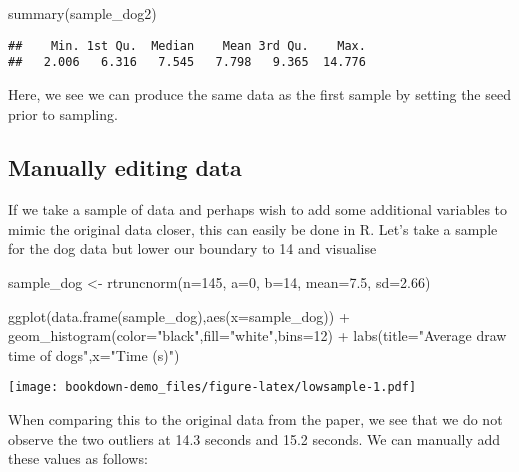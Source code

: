 \documentclass[
]{book}
\newenvironment{Shaded}{\begin{snugshade}}{\end{snugshade}}
\newcommand{\AttributeTok}[1]{\textcolor[rgb]{0.77,0.63,0.00}{#1}}
\newcommand{\DecValTok}[1]{\textcolor[rgb]{0.00,0.00,0.81}{#1}}
\newcommand{\FloatTok}[1]{\textcolor[rgb]{0.00,0.00,0.81}{#1}}
\newcommand{\FunctionTok}[1]{\textcolor[rgb]{0.00,0.00,0.00}{#1}}
\newcommand{\NormalTok}[1]{#1}
\newcommand{\OtherTok}[1]{\textcolor[rgb]{0.56,0.35,0.01}{#1}}
\newcommand{\SpecialCharTok}[1]{\textcolor[rgb]{0.00,0.00,0.00}{#1}}
\newcommand{\StringTok}[1]{\textcolor[rgb]{0.31,0.60,0.02}{#1}}
\begin{document}
\begin{Shaded}
\begin{Highlighting}[]
\FunctionTok{summary}\NormalTok{(sample\_dog2)}
\end{Highlighting}
\end{Shaded}

\begin{verbatim}
##    Min. 1st Qu.  Median    Mean 3rd Qu.    Max. 
##   2.006   6.316   7.545   7.798   9.365  14.776
\end{verbatim}

Here, we see we can produce the same data as the first sample by setting the seed prior to sampling.

\hypertarget{manually-editing-data}{%
\subsection{Manually editing data}\label{manually-editing-data}}

If we take a sample of data and perhaps wish to add some additional variables to mimic the original data closer, this can easily be done in R. Let's take a sample for the dog data but lower our boundary to 14 and visualise

\begin{Shaded}
\begin{Highlighting}[]
\NormalTok{sample\_dog }\OtherTok{\textless{}{-}} \FunctionTok{rtruncnorm}\NormalTok{(}\AttributeTok{n=}\DecValTok{145}\NormalTok{, }\AttributeTok{a=}\DecValTok{0}\NormalTok{, }\AttributeTok{b=}\DecValTok{14}\NormalTok{, }\AttributeTok{mean=}\FloatTok{7.5}\NormalTok{, }\AttributeTok{sd=}\FloatTok{2.66}\NormalTok{)}

\FunctionTok{ggplot}\NormalTok{(}\FunctionTok{data.frame}\NormalTok{(sample\_dog),}\FunctionTok{aes}\NormalTok{(}\AttributeTok{x=}\NormalTok{sample\_dog)) }\SpecialCharTok{+} \FunctionTok{geom\_histogram}\NormalTok{(}\AttributeTok{color=}\StringTok{"black"}\NormalTok{,}\AttributeTok{fill=}\StringTok{"white"}\NormalTok{,}\AttributeTok{bins=}\DecValTok{12}\NormalTok{) }\SpecialCharTok{+} 
            \FunctionTok{labs}\NormalTok{(}\AttributeTok{title=}\StringTok{"Average draw time of dogs"}\NormalTok{,}\AttributeTok{x=}\StringTok{"Time (s)"}\NormalTok{)}
\end{Highlighting}
\end{Shaded}

\texttt{[image: bookdown-demo\_files/figure-latex/lowsample-1.pdf]}

When comparing this to the original data from the paper, we see that we do not observe the two outliers at 14.3 seconds and 15.2 seconds. We can manually add these values as follows:
\end{document}
